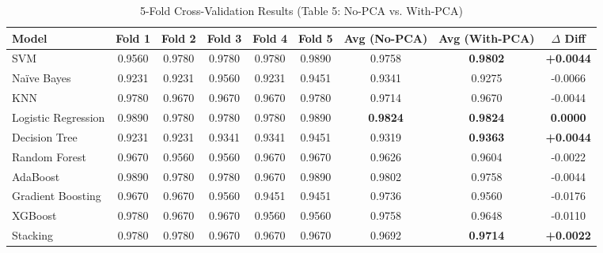 \documentclass[12pt,a4paper]{article}
\begin{document}
\begin{table}[H]
\centering
\caption{5-Fold Cross-Validation Results (Table 5: No-PCA vs. With-PCA)}
\label{tab:cv_results_table5}
\small
\begin{tabular}{|l|c|c|c|c|c|c|c|c|}
\hline
\textbf{Model} & \textbf{Fold 1} & \textbf{Fold 2} & \textbf{Fold 3} & \textbf{Fold 4} & \textbf{Fold 5} & \textbf{Avg (No-PCA)} & \textbf{Avg (With-PCA)} & \textbf{$\Delta$ Diff}\\ \hline
SVM & 0.9560 & 0.9780 & 0.9780 & 0.9780 & 0.9890 & 0.9758 & \textbf{0.9802} & \textbf{+0.0044}\\ \hline
Na\"ive Bayes & 0.9231 & 0.9231 & 0.9560 & 0.9231 & 0.9451 & 0.9341 & 0.9275 & -0.0066\\ \hline
KNN & 0.9780 & 0.9670 & 0.9670 & 0.9670 & 0.9780 & 0.9714 & 0.9670 & -0.0044\\ \hline
Logistic Regression & 0.9890 & 0.9780 & 0.9780 & 0.9780 & 0.9890 & \textbf{0.9824} & \textbf{0.9824} & \textbf{0.0000}\\ \hline
Decision Tree & 0.9231 & 0.9231 & 0.9341 & 0.9341 & 0.9451 & 0.9319 & \textbf{0.9363} & \textbf{+0.0044}\\ \hline
Random Forest & 0.9670 & 0.9560 & 0.9560 & 0.9670 & 0.9670 & 0.9626 & 0.9604 & -0.0022\\ \hline
AdaBoost & 0.9890 & 0.9780 & 0.9780 & 0.9670 & 0.9890 & 0.9802 & 0.9758 & -0.0044\\ \hline
Gradient Boosting & 0.9670 & 0.9670 & 0.9560 & 0.9451 & 0.9451 & 0.9736 & 0.9560 & -0.0176\\ \hline
XGBoost & 0.9780 & 0.9670 & 0.9670 & 0.9560 & 0.9560 & 0.9758 & 0.9648 & -0.0110\\ \hline
Stacking & 0.9780 & 0.9780 & 0.9670 & 0.9670 & 0.9670 & 0.9692 & \textbf{0.9714} & \textbf{+0.0022}\\ \hline
\end{tabular}
\end{table}
\end{document}
